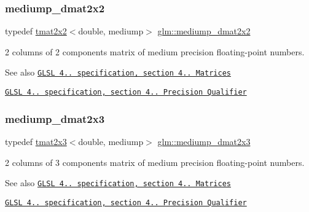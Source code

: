 \subsubsection{\texorpdfstring{mediump\+\_\+dmat2x2}{mediump\_dmat2x2}}
{\footnotesize\ttfamily typedef \hyperlink{structglm_1_1tmat2x2}{tmat2x2}$<$double, mediump$>$ \hyperlink{group__core__precision_ga949bee59342f1c3258522bacd07ffe95}{glm\+::mediump\+\_\+dmat2x2}}

2 columns of 2 components matrix of medium precision floating-\/point numbers.

\begin{DoxySeeAlso}{See also}
\href{http://www.opengl.org/registry/doc/GLSLangSpec.4.20.8.pdf}{\tt G\+L\+SL 4.. specification, section 4.. Matrices} 

\href{http://www.opengl.org/registry/doc/GLSLangSpec.4.20.8.pdf}{\tt G\+L\+SL 4.. specification, section 4.. Precision Qualifier} 
\end{DoxySeeAlso}
\mbox{\label{group__core__precision_ga0b187380697f66a25000b307db9cb41a}} 
\subsubsection{\texorpdfstring{mediump\+\_\+dmat2x3}{mediump\_dmat2x3}}
{\footnotesize\ttfamily typedef \hyperlink{structglm_1_1tmat2x3}{tmat2x3}$<$double, mediump$>$ \hyperlink{group__core__precision_ga0b187380697f66a25000b307db9cb41a}{glm\+::mediump\+\_\+dmat2x3}}

2 columns of 3 components matrix of medium precision floating-\/point numbers.

\begin{DoxySeeAlso}{See also}
\href{http://www.opengl.org/registry/doc/GLSLangSpec.4.20.8.pdf}{\tt G\+L\+SL 4.. specification, section 4.. Matrices} 

\href{http://www.opengl.org/registry/doc/GLSLangSpec.4.20.8.pdf}{\tt G\+L\+SL 4.. specification, section 4.. Precision Qualifier} 
\end{DoxySeeAlso}
\mbox{\label{group__core__precision_ga837b8ead9807e10740dddfc99dabe8d7}} 
